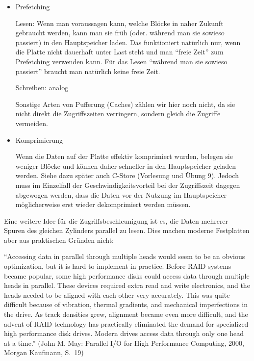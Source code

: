 \begin{solution}
\begin{itemize}
	\item Prefetching

	Lesen: Wenn man voraussagen kann, welche Blöcke in naher Zukunft gebraucht werden, kann man sie früh (oder. während man sie sowieso passiert) in den Hauptspeicher laden.
	Das funktioniert natürlich nur, wenn die Platte nicht dauerhaft unter Last steht und man 	"`freie Zeit"' zum Prefetching verwenden kann. Für das Lesen "`während man sie sowieso passiert"' braucht man natürlich keine freie Zeit.

	Schreiben: analog

	Sonstige Arten von Pufferung (Caches) zählen wir hier noch nicht, da sie nicht direkt die Zugriffszeiten verringern, sondern gleich die Zugriffe vermeiden.

	\item Komprimierung

	Wenn die Daten auf der Platte effektiv komprimiert wurden, belegen sie weniger Blöcke und können daher schneller in den Hauptspeicher geladen werden. Siehe dazu später auch C-Store (Vorlesung und Übung 9). Jedoch muss im Einzelfall der Geschwindigkeitsvorteil bei der Zugriffszeit dagegen abgewogen werden, dass die Daten vor der Nutzung im Hauptspeicher möglicherweise erst wieder dekomprimiert werden müssen.

\end{itemize}
\end{solution}

\begin{note}
	Eine weitere Idee für die Zugriffsbeschleunigung ist es, die Daten mehrerer Spuren des gleichen Zylinders parallel zu lesen.
	Dies machen moderne Festplatten aber aus praktischen Gründen nicht:

	"`Accessing data in parallel through multiple heads would seem to be an obvious optimization, but it is hard to implement in practice. Before RAID systems became popular, some high performance disks could access data through multiple heads in parallel. These devices required extra read and write electronics, and the heads needed to be aligned with each other very accurately. This was quite difficult because of vibration, thermal gradients, and mechanical imperfections in the drive. As track densities grew, alignment became even more difficult, and the advent of RAID technology has practically eliminated the demand for specialized high performance disk drives. Modern drives access data through only one head at a time."' (John M. May: Parallel I/O for High Performance Computing, 2000, Morgan Kaufmann, S.~19)
\end{note}
